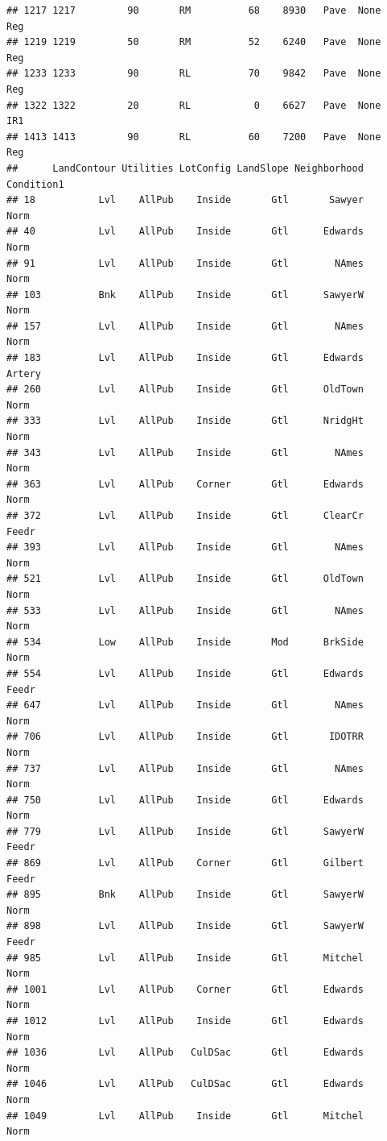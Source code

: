 \documentclass[]{article}
\begin{document}
\begin{verbatim}
## 1217 1217         90       RM          68    8930   Pave  None      Reg
## 1219 1219         50       RM          52    6240   Pave  None      Reg
## 1233 1233         90       RL          70    9842   Pave  None      Reg
## 1322 1322         20       RL           0    6627   Pave  None      IR1
## 1413 1413         90       RL          60    7200   Pave  None      Reg
##      LandContour Utilities LotConfig LandSlope Neighborhood Condition1
## 18           Lvl    AllPub    Inside       Gtl       Sawyer       Norm
## 40           Lvl    AllPub    Inside       Gtl      Edwards       Norm
## 91           Lvl    AllPub    Inside       Gtl        NAmes       Norm
## 103          Bnk    AllPub    Inside       Gtl      SawyerW       Norm
## 157          Lvl    AllPub    Inside       Gtl        NAmes       Norm
## 183          Lvl    AllPub    Inside       Gtl      Edwards     Artery
## 260          Lvl    AllPub    Inside       Gtl      OldTown       Norm
## 333          Lvl    AllPub    Inside       Gtl      NridgHt       Norm
## 343          Lvl    AllPub    Inside       Gtl        NAmes       Norm
## 363          Lvl    AllPub    Corner       Gtl      Edwards       Norm
## 372          Lvl    AllPub    Inside       Gtl      ClearCr      Feedr
## 393          Lvl    AllPub    Inside       Gtl        NAmes       Norm
## 521          Lvl    AllPub    Inside       Gtl      OldTown       Norm
## 533          Lvl    AllPub    Inside       Gtl        NAmes       Norm
## 534          Low    AllPub    Inside       Mod      BrkSide       Norm
## 554          Lvl    AllPub    Inside       Gtl      Edwards      Feedr
## 647          Lvl    AllPub    Inside       Gtl        NAmes       Norm
## 706          Lvl    AllPub    Inside       Gtl       IDOTRR       Norm
## 737          Lvl    AllPub    Inside       Gtl        NAmes       Norm
## 750          Lvl    AllPub    Inside       Gtl      Edwards       Norm
## 779          Lvl    AllPub    Inside       Gtl      SawyerW      Feedr
## 869          Lvl    AllPub    Corner       Gtl      Gilbert      Feedr
## 895          Bnk    AllPub    Inside       Gtl      SawyerW       Norm
## 898          Lvl    AllPub    Inside       Gtl      SawyerW      Feedr
## 985          Lvl    AllPub    Inside       Gtl      Mitchel       Norm
## 1001         Lvl    AllPub    Corner       Gtl      Edwards       Norm
## 1012         Lvl    AllPub    Inside       Gtl      Edwards       Norm
## 1036         Lvl    AllPub   CulDSac       Gtl      Edwards       Norm
## 1046         Lvl    AllPub   CulDSac       Gtl      Edwards       Norm
## 1049         Lvl    AllPub    Inside       Gtl      Mitchel       Norm

\end{verbatim}
\end{document}
